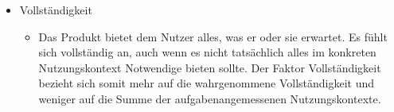 \begin{itemize}
    \item Vollständigkeit 
    \begin{itemize}
        \item Das Produkt bietet dem Nutzer alles, was er oder sie erwartet. Es fühlt sich
        vollständig an, auch wenn es nicht tatsächlich alles im konkreten Nutzungskontext
        Notwendige bieten sollte. Der Faktor Vollständigkeit bezieht sich somit mehr auf die
        wahrgenommene Vollständigkeit und weniger auf die Summe der aufgabenangemessenen
        Nutzungskontexte. 
    \end{itemize}
\end{itemize}
